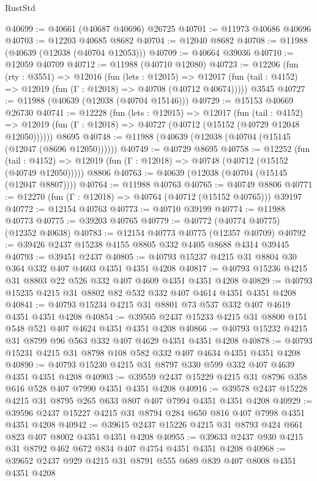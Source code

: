 \begin{lexlean}{RustStd}
\begin{coremodule}
@40699 := @40661 (@40687 @40696) @26725
@40701 := @11973 @40686 @40696
@40703 := @12203 @40685 @8682
@40704 := @12040 @8682
@40708 := @11988 (@40639 (@12038 (@40704 @12053)))
@40709 := @40664 @39036
@40710 := @12059 @40709
@40712 := @11988 (@40710 @12080)
@40723 := @12206
    (fun (rty : @3551) =>
    @12016
      (fun (lets : @12015) =>
      @12017 (fun (tail : @4152) => @12019 (fun (Γ : @12018) => @40708 (@40712 @40674)))))
    @3545
@40727 := @11988 (@40639 (@12038 (@40704 @15146)))
@40729 := @15153 @40669 @26730
@40741 := @12228
    (fun (lets : @12015) =>
    @12017
      (fun (tail : @4152) =>
      @12019 (fun (Γ : @12018) => @40727 (@40712 (@15152 (@40729 @12048 @12050))))))
    @8695
@40748 := @11988 (@40639 (@12038 (@40704 (@15145 (@12047 (@8696 @12050))))))
@40749 := @40729 @8695
@40758 := @12252
    (fun (tail : @4152) => @12019 (fun (Γ : @12018) => @40748 (@40712 (@15152 (@40749 @12050)))))
    @8806
@40763 := @40639 (@12038 (@40704 (@15145 (@12047 @8807))))
@40764 := @11988 @40763
@40765 := @40749 @8806
@40771 := @12270 (fun (Γ : @12018) => @40764 (@40712 (@15152 @40765))) @39197
@40772 := @12154 @40763
@40773 := @40710 @39199
@40774 := @11988 @40773
@40775 := @39203 @40765
@40779 := @40772 (@40774 @40775) (@12352 @40638)
@40783 := @12154 @40773 @40775 (@12357 @40709)
@40792 := @39426 @2437 @15238 @4155 @8805 @332 @4405 @8688 @4314 @39445
@40793 := @39451 @2437
@40805 := @40793 @15237 @4215 @31 @8804 @30 @364 @332 @407 @4603 @4351 @4351 @4208
@40817 := @40793 @15236 @4215 @31 @8803 @22 @526 @332 @407 @4609 @4351 @4351 @4208
@40829 := @40793 @15235 @4215 @31 @8802 @82 @532 @332 @407 @4614 @4351 @4351 @4208
@40841 := @40793 @15234 @4215 @31 @8801 @73 @537 @332 @407 @4619 @4351 @4351 @4208
@40854 := @39505 @2437 @15233 @4215 @31 @8800 @151 @548 @521 @407 @4624 @4351 @4351 @4208
@40866 := @40793 @15232 @4215 @31 @8799 @96 @563 @332 @407 @4629 @4351 @4351 @4208
@40878 := @40793 @15231 @4215 @31 @8798 @108 @582 @332 @407 @4634 @4351 @4351 @4208
@40890 := @40793 @15230 @4215 @31 @8797 @330 @599 @332 @407 @4639 @4351 @4351 @4208
@40903 := @39559 @2437 @15229 @4215 @31 @8796 @358 @616 @528 @407 @7990 @4351 @4351 @4208
@40916 := @39578 @2437 @15228 @4215 @31 @8795 @265 @633 @807 @407 @7994 @4351 @4351 @4208
@40929 := @39596 @2437 @15227 @4215 @31 @8794 @284 @650 @816 @407 @7998 @4351 @4351 @4208
@40942 := @39615 @2437 @15226 @4215 @31 @8793 @424 @661 @823 @407 @8002 @4351 @4351 @4208
@40955 := @39633 @2437 @930 @4215 @31 @8792 @462 @672 @834 @407 @4754 @4351 @4351 @4208
@40968 := @39652 @2437 @929 @4215 @31 @8791 @555 @689 @839 @407 @8008 @4351 @4351 @4208

\end{coremodule}
\end{lexlean}
